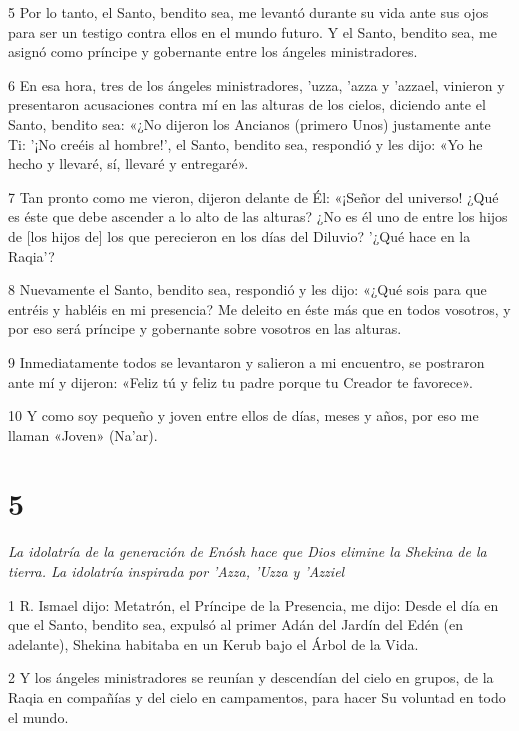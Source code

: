 \par 5 Por lo tanto, el Santo, bendito sea, me levantó durante su vida ante sus ojos para ser un testigo contra ellos en el mundo futuro. Y el Santo, bendito sea, me asignó como príncipe y gobernante entre los ángeles ministradores.

\par 6 En esa hora, tres de los ángeles ministradores, 'uzza, 'azza y 'azzael, vinieron y presentaron acusaciones contra mí en las alturas de los cielos, diciendo ante el Santo, bendito sea: «¿No dijeron los Ancianos (primero Unos) justamente ante Ti: '¡No creéis al hombre!', el Santo, bendito sea, respondió y les dijo: «Yo he hecho y llevaré, sí, llevaré y entregaré».

\par 7 Tan pronto como me vieron, dijeron delante de Él: «¡Señor del universo! ¿Qué es éste que debe ascender a lo alto de las alturas? ¿No es él uno de entre los hijos de [los hijos de] los que perecieron en los días del Diluvio? '¿Qué hace en la Raqia'?

\par 8 Nuevamente el Santo, bendito sea, respondió y les dijo: «¿Qué sois para que entréis y habléis en mi presencia? Me deleito en éste más que en todos vosotros, y por eso será príncipe y gobernante sobre vosotros en las alturas.

\par 9 Inmediatamente todos se levantaron y salieron a mi encuentro, se postraron ante mí y dijeron: «Feliz tú y feliz tu padre porque tu Creador te favorece».

\par 10 Y como soy pequeño y joven entre ellos de días, meses y años, por eso me llaman «Joven» (Na'ar).

\chapter{5}

\par \textit{La idolatría de la generación de Enósh hace que Dios elimine la Shekina de la tierra. La idolatría inspirada por 'Azza, 'Uzza y 'Azziel}

\par 1 R. Ismael dijo: Metatrón, el Príncipe de la Presencia, me dijo: Desde el día en que el Santo, bendito sea, expulsó al primer Adán del Jardín del Edén (en adelante), Shekina habitaba en un Kerub bajo el Árbol de la Vida.

\par 2 Y los ángeles ministradores se reunían y descendían del cielo en grupos, de la Raqia en compañías y del cielo en campamentos, para hacer Su voluntad en todo el mundo.

